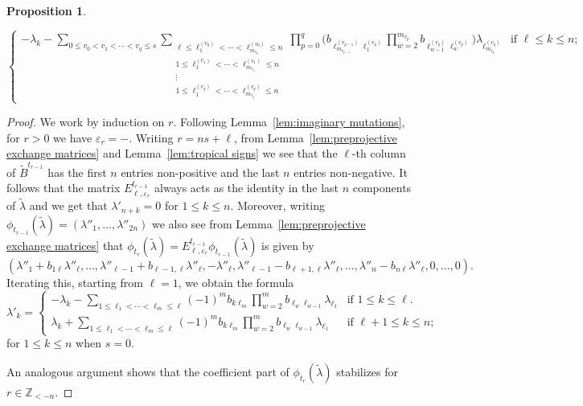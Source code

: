 \documentclass{amsart}
\newtheorem{proposition}[theorem]{Proposition}
\numberwithin{theorem}{section}
\newcommand{\ZZ}{\mathbb{Z}}
\begin{document}
\begin{proposition}
\begin{itemize}
\begin{equation}
\begin{cases}
            -\lambda_k-\sum_{0\le v_0<v_1<\cdots<v_q\le s}\sum\limits_{\substack{\ell\le \ell^{(v_0)}_1<\cdots<\ell^{(v_0)}_{m_{v_0}}\le n\\ 1\le \ell^{(v_1)}_1<\cdots<\ell^{(v_1)}_{m_{v_1}}\le n\\ \vdots\\ 1\le \ell^{(v_q)}_1<\cdots<\ell^{(v_q)}_{m_{v_q}}\le n}} \prod\limits_{p=0}^q \Big( b_{\ell^{(v_{p-1})}_{m_{v_{p-1}}}\ell^{(v_p)}_1} \prod\limits_{w=2}^{m_{v_p}} b_{\ell^{(v_p)}_{w-1} \ell^{(v_p)}_w} \Big)\lambda_{\ell^{(v_q)}_{m_{v_q}}} & \text{if $\ell\le k\le n$;}
          \end{cases}
        \end{equation}
    \end{itemize}
  \end{proposition}
  \begin{proof}
    We work by induction on $r$.
    Following Lemma~\ref{lem:imaginary mutations}, for $r>0$ we have $\varepsilon_r=-$.
    Writing $r=ns+\ell$, from Lemma~\ref{lem:preprojective exchange matrices} and Lemma~\ref{lem:tropical signs} we see that the $\ell$-th column of $\tilde B^{t_{r-1}}$ has the first $n$ entries non-positive and the last $n$ entries non-negative.
    It follows that the matrix $E^{t_{r-1}}_{\ell,\varepsilon_r}$ always acts as the identity in the last $n$ components of $\tilde\lambda$ and we get that $\lambda'_{n+k}=0$ for $1\le k\le n$.
    Moreover, writing $\phi_{t_{r-1}}(\tilde\lambda)=(\lambda''_1,\ldots,\lambda''_{2n})$ we also see from Lemma~\ref{lem:preprojective exchange matrices} that $\phi_{t_r}(\tilde\lambda)=E^{t_{r-1}}_{\ell,\varepsilon_r}\phi_{t_{r-1}}(\tilde\lambda)$ is given by
    \[(\lambda''_1+b_{1\ell}\lambda''_\ell,\ldots,\lambda''_{\ell-1}+b_{\ell-1,\ell}\lambda''_\ell,-\lambda''_\ell,\lambda''_{\ell-1}-b_{\ell+1,\ell}\lambda''_\ell,\ldots,\lambda''_n-b_{n\ell}\lambda''_\ell,0,\ldots,0).\]
    Iterating this, starting from $\ell=1$, we obtain the formula
    \begin{equation}
      \lambda'_k=
      \begin{cases} 
        -\lambda_k-\sum\limits_{1\le \ell_1<\cdots<\ell_m\le \ell} (-1)^m b_{k\ell_m} \prod\limits_{w=2}^m b_{\ell_w \ell_{w-1}}\lambda_{\ell_1} & \text{if $1\le k\le \ell$.}\\
        \lambda_k+\sum\limits_{1\le \ell_1<\cdots<\ell_m\le \ell} (-1)^m b_{k\ell_m} \prod\limits_{w=2}^m b_{\ell_w \ell_{w-1}}\lambda_{\ell_1} & \text{if $\ell+1\le k\le n$;}
      \end{cases}
    \end{equation}
    for $1\le k\le n$ when $s=0$.

    An analogous argument shows that the coefficient part of $\phi_{t_r}(\tilde\lambda)$ stabilizes for $r\in\ZZ_{<-n}$.

  \end{proof}


  
\end{document}
